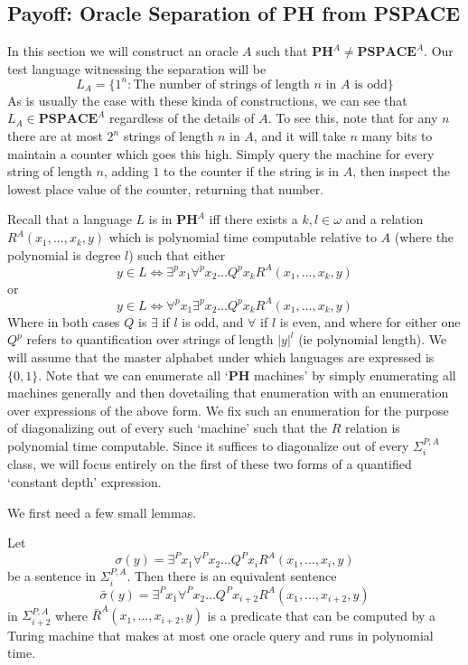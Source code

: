 \subsection{Payoff: Oracle Separation of PH from PSPACE}
In this section we will construct an oracle $A$ such that $\bm{PH}^A \neq \bm{PSPACE}^A$. Our test language witnessing the separation will be 
\[ L_A =\{1^n: \textrm{The number of strings of length $n$ in $A$ is odd}\} \]
As is usually the case with these kinda of constructions, we can see that $L_A \in \bm{PSPACE}^A$ regardless of the details of $A$. To see this, note that for any $n$ there are at most $2^n$ strings of length $n$ in $A$, and it will take $n$ many bits to maintain a counter which goes this high. Simply query the machine for every string of length $n$, adding $1$ to the counter if the string is in $A$, then inspect the lowest place value of the counter, returning that number. \par 
Recall that a language $L$ is in $\bm{PH}^A$ iff there exists a $k,l \in \omega$ and a relation $R^A(x_1,...,x_k,y)$ which is polynomial time computable relative to $A$ (where the polynomial is degree $l$) such that either 
  \[ y \in L \iff \exists^px_1 \forall^p x_2 \ldots Q^p x_k R^A(x_1,\ldots,x_k,y) \]
 or
  \[ y \in L \iff \forall^px_1 \exists^p x_2 \ldots Q^p x_k R^A(x_1,\ldots,x_k,y) \]
Where in both cases $Q$ is $\exists$ if $l$ is odd, and $\forall$ if $l$ is even, and where for either one $Q^p$ refers to quantification over strings of length $|y|^l$ (ie polynomial length). We will assume that the master alphabet under which languages are expressed is $\{0,1\}$. Note that we can enumerate all `$\bm{PH}$ machines' by simply enumerating all machines generally and then dovetailing that enumeration with an enumeration over expressions of the above form. We fix such an enumeration for the purpose of diagonalizing out of every such `machine' such that the $R$ relation is polynomial time computable. Since it suffices to diagonalize out of every $\Sigma_i^{P,A}$ class, we will focus entirely on the first of these two forms of a quantified `constant depth' expression. \par 
We first need a few small lemmas. 
\begin{lemma}
	Let \[\sigma(y) = \exists^Px_1\forall^P x_2 \ldots Q^P x_i R^A(x_1,...,x_i,y) \]
	be a sentence in $\Sigma^{P,A}_i$. Then there is an equivalent sentence 
	\[ \bar{\sigma}(y) = \exists^Px_1\forall^P x_2 \ldots Q^P x_{i+2}R^A(x_1,...,x_{i+2},y) \]
	in $\Sigma^{P,A}_{i+2}$ where $\bar{R}^A(x_1,...,x_{i+2},y)$ is a predicate that can be computed by a Turing machine that makes at most one oracle query and runs in polynomial time. 
\end{lemma}
